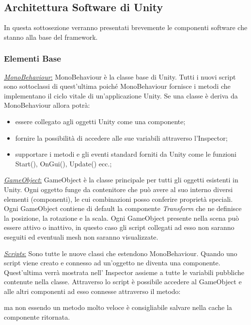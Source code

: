 \newpage
	

\subsection{Architettura Software di Unity}

In questa sottosezione verranno presentati brevemente le componenti software che stanno alla base del framework.

\subsubsection{Elementi Base}



\begin{flushleft}
	\underline{\textit{MonoBehaviour}:}
	MonoBehaviour è la classe base di Unity. Tutti i nuovi script sono sottoclassi di quest'ultima poiché MonoBehaviour fornisce i metodi che implementano il ciclo vitale di un'applicazione Unity.
	Se una classe è deriva da MonoBehaviour allora potrà:
	 \begin{itemize}
	 	\item essere collegato agli oggetti Unity come una componente;
	 	\item fornire la possibilità di accedere alle sue variabili attraverso l'Inspector;
	 	\item supportare i metodi e gli eventi standard forniti da Unity come le funzioni Start(), OnGui(), Update() ecc.;
	 \end{itemize}
\end{flushleft}

\begin{flushleft}
\underline{\textit{GameObject}:}
GameObject è la classe principale per tutti gli oggetti esistenti in Unity. Ogni oggetto funge da contenitore che può avere al suo interno diversi elementi (componenti), le cui combinazioni posso conferire proprietà speciali. Ogni GameObject contiene di default la componente \textit{Transform} che ne definisce la posizione, la rotazione e la scala. Ogni GameObject presente nella scena può essere attivo o inattivo, in questo caso gli script collegati ad esso non saranno eseguiti ed eventuali mesh non saranno visualizzate.
\end{flushleft}

\begin{flushleft}
	\underline{\textit{Scripts}:}
Sono tutte le nuove classi che estendono MonoBehaviour. Quando uno script viene creato e connesso ad un'oggetto ne diventa una componente. Quest'ultima verrà mostrata nell' Inspector assieme a tutte le variabili pubbliche contenute nella classe. Attraverso lo script è possibile accedere al GameObject e alle altri componenti ad esso connesse attraverso il metodo:
\begin{algorithmic}
\end{algorithmic}
ma non essendo un metodo molto veloce è consigliabile salvare nella cache la componente ritornata. 
\end{flushleft}

